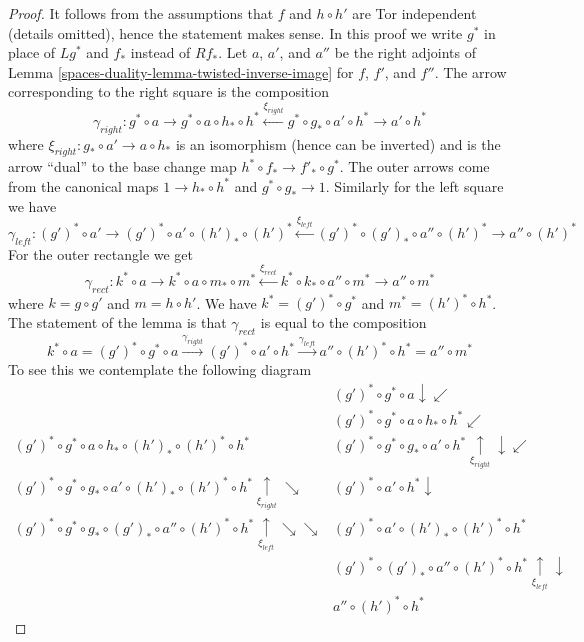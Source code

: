 \begin{proof}
It follows from the assumptions that $f$ and $h \circ h'$ are Tor
independent (details omitted), hence the statement makes sense.
In this proof we write $g^*$ in place of $Lg^*$ and $f_*$ instead
of $Rf_*$. Let $a$, $a'$, and $a''$ be the right adjoints of
Lemma \ref{spaces-duality-lemma-twisted-inverse-image}
for $f$, $f'$, and $f''$. The arrow corresponding to the right
square is the composition
$$
\gamma_{right} :
g^* \circ a \to g^* \circ a \circ h_* \circ h^*
\xleftarrow{\xi_{right}} g^* \circ g_* \circ a' \circ h^* \to a' \circ h^*
$$
where $\xi_{right} : g_* \circ a' \to a \circ h_*$
is an isomorphism (hence can be inverted)
and is the arrow ``dual'' to the base change map
$h^* \circ f_* \to f'_* \circ g^*$. The outer arrows come
from the canonical maps $1 \to h_* \circ h^*$ and $g^* \circ g_* \to 1$.
Similarly for the left square we have
$$
\gamma_{left} :
(g')^* \circ a' \to (g')^* \circ a' \circ (h')_* \circ (h')^*
\xleftarrow{\xi_{left}}
(g')^* \circ (g')_* \circ a'' \circ (h')^* \to a'' \circ (h')^*
$$
For the outer rectangle we get
$$
\gamma_{rect} :
k^* \circ a \to
k^* \circ a \circ m_* \circ m^* \xleftarrow{\xi_{rect}}
k^* \circ k_* \circ a'' \circ m^* \to
a'' \circ m^*
$$
where $k = g \circ g'$ and $m = h \circ h'$.
We have $k^* = (g')^* \circ g^*$ and $m^* = (h')^* \circ h^*$.
The statement of the lemma is that $\gamma_{rect}$
is equal to the composition
$$
k^* \circ a =
(g')^* \circ g^* \circ a \xrightarrow{\gamma_{right}}
(g')^* \circ a' \circ h^* \xrightarrow{\gamma_{left}}
a'' \circ (h')^* \circ h^* = a'' \circ m^*
$$
To see this we contemplate the following diagram
$$
\begin{array}{cc} & (g')^* \circ g^* \circ a \downarrow\swarrow \\  & (g')^* \circ g^* \circ a \circ h_* \circ h^* \swarrow \\ (g')^* \circ g^* \circ a \circ h_* \circ (h')_* \circ (h')^* \circ h^* & (g')^* \circ g^* \circ g_* \circ a' \circ h^*
\underset{\xi_{right}}{\uparrow}\downarrow\swarrow \\ (g')^* \circ g^* \circ g_* \circ a' \circ (h')_* \circ (h')^* \circ h^*
\underset{\xi_{right}}{\uparrow}\searrow & (g')^* \circ a' \circ h^* \downarrow \\ (g')^* \circ g^* \circ g_* \circ (g')_* \circ a'' \circ (h')^* \circ h^*
\underset{\xi_{left}}{\uparrow}\searrow\searrow & (g')^* \circ a' \circ (h')_* \circ (h')^* \circ h^* \\  & (g')^*\circ (g')_* \circ a'' \circ (h')^* \circ h^*
\underset{\xi_{left}}{\uparrow}\downarrow \\  & a'' \circ (h')^* \circ h^*\end{array}
$$
\end{proof}

